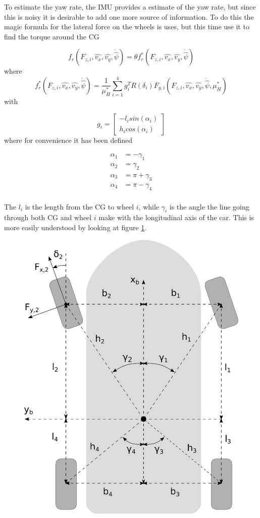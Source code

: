 To estimate the yaw rate, the \gls{IMU} provides a estimate of the yaw rate, but since this is noisy it is desirable to add one more source of information. To do this the magic formula for the lateral force on the wheels is uses, but this time use it to find the torque around the CG

\begin{equation}
    f_r(F_{z,i}, \hat{v_x}, \hat{v_y}, \dot{\hat{\psi}}) =\theta f_r^*(F_{z,i}, \hat{v_x}, \hat{v_y}, \dot{\hat{\psi}}) 
\end{equation}
where
\begin{equation}
    f_r^*(F_{z,i}, \hat{v_x}, \hat{v_y}, \dot{\hat{\psi}}) = \frac{1}{\mu_H^*}\sum_{i=1}^{4}g_i^TR(\delta_i)F_{y,i}(F_{z,i}, \hat{v_x}, \hat{v_y}, \dot{\hat{\psi}}, \mu_H^*)
\end{equation}
with 

\begin{equation}
    g_i = \begin{bmatrix} -l_i sin(\alpha_i) \\ h_i cos(\alpha_i)
    \end{bmatrix}
\end{equation}
where for convenience it has been defined

\begin{align}
    \alpha_1 & = -\gamma_1 \\
    \alpha_2 & = \gamma_2 \\
    \alpha_3 & = \pi + \gamma_3 \\
    \alpha_4 & = \pi -\gamma_4 \\
\end{align}

The $l_i$ is the length from the \gls{CG} to wheel $i$, while $\gamma_i$ is the angle the line going through both CG and wheel $i$ make with the longitudinal axis of the car. This is more easily understood by looking at figure \ref{Fig:WheelTorques}. 

\begin{figure}
    \centering
    \includegraphics[width=0.5\linewidth]{0_Images/3_Theory/TorqueCalculations.eps}
    \label{Fig:WheelTorques}
\end{figure}

